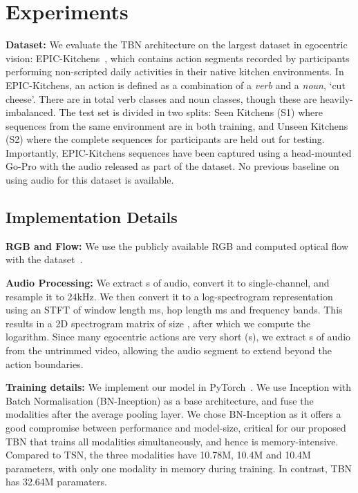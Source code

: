 \documentclass[10pt,twocolumn,letterpaper]{article}
\begin{document}
\section{Experiments}
\noindent \textbf{Dataset:} 
We evaluate the TBN architecture on the largest dataset in egocentric vision: EPIC-Kitchens~\cite{Damen_2018_ECCV},
which contains  action segments recorded by  participants performing non-scripted daily activities in their native kitchen environments. In EPIC-Kitchens, an action
is defined as a combination of a \textit{verb} and a \textit{noun}, \eg `cut cheese'. There are in total  verb classes and 
noun classes, though these are heavily-imbalanced. The test set is divided in two splits: Seen Kitchens (S1) where sequences from the same environment are in both training, and Unseen Kitchens (S2) where the complete sequences for  participants are held out for testing.
Importantly, EPIC-Kitchens sequences have been captured using a head-mounted Go-Pro with the audio released as part of the dataset. No previous baseline on using audio for this dataset is available.


\subsection{Implementation Details}\label{sec:implementation}
\noindent\textbf{RGB and Flow:} We use the publicly available RGB and computed optical flow with the dataset~\cite{Damen_2018_ECCV}. 

\noindent\textbf{Audio Processing:} We extract s of audio, convert it to single-channel, and resample it to 24kHz. We then convert it to a log-spectrogram representation using an STFT of window length ms, hop length ms and
 frequency bands. This results in a 2D spectrogram matrix of size , after which we compute the logarithm. Since many egocentric actions are very short (s),
we extract s of audio from the untrimmed video, allowing the audio segment to extend beyond the action boundaries.


\noindent\textbf{Training details:}
We implement our model in PyTorch~\cite{paszke2017automatic}. 
We use Inception with Batch Normalisation (BN-Inception) \cite{pmlr-v37-ioffe15} as a
base architecture, and fuse the modalities after the average pooling layer. 
We chose BN-Inception as it offers a good compromise between performance and model-size, critical
for our proposed TBN that trains all modalities simultaneously, and hence is memory-intensive. Compared to TSN, the three modalities have 10.78M, 10.4M and 10.4M parameters, with only one modality in memory during training. In contrast, 
TBN has 32.64M paramaters.
\end{document}
